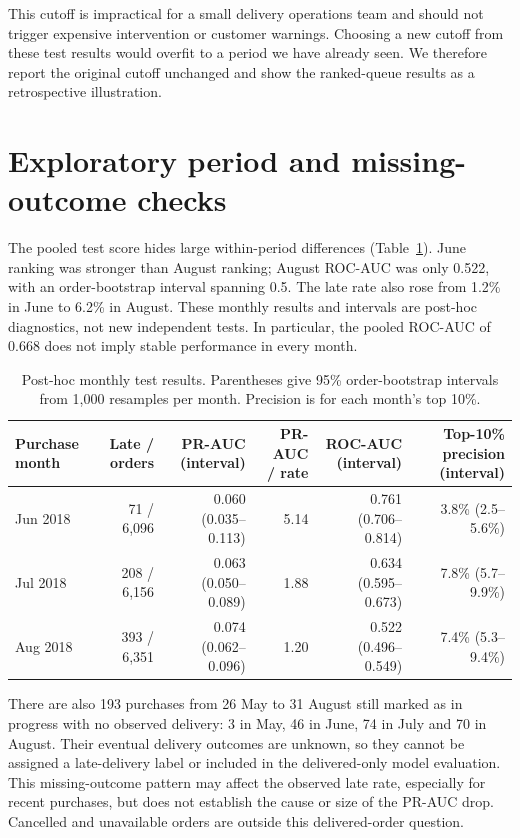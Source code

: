 \documentclass[12pt,a4paper]{article}
\begin{document}
This cutoff is impractical for a small delivery operations team and should not trigger expensive intervention or customer warnings. Choosing a new cutoff from these test results would overfit to a period we have already seen. We therefore report the original cutoff unchanged and show the ranked-queue results as a retrospective illustration.

\section*{Exploratory period and missing-outcome checks}
The pooled test score hides large within-period differences (Table~\ref{tab:months}). June ranking was stronger than August ranking; August ROC-AUC was only 0.522, with an order-bootstrap interval spanning 0.5. The late rate also rose from 1.2\% in June to 6.2\% in August. These monthly results and intervals are post-hoc diagnostics, not new independent tests. In particular, the pooled ROC-AUC of 0.668 does not imply stable performance in every month.

\begin{table}[h]
\centering\scriptsize
\caption{Post-hoc monthly test results. Parentheses give 95\% order-bootstrap intervals from 1,000 resamples per month. Precision is for each month's top 10\%.}
\label{tab:months}
\begin{tabular}{@{}lrrrrr@{}}
\toprule
Purchase month & Late / orders & PR-AUC (interval) & PR-AUC / rate & ROC-AUC (interval) & Top-10\% precision (interval) \\
\midrule
Jun 2018 & 71 / 6,096 & 0.060 (0.035--0.113) & 5.14 & 0.761 (0.706--0.814) & 3.8\% (2.5--5.6\%) \\
Jul 2018 & 208 / 6,156 & 0.063 (0.050--0.089) & 1.88 & 0.634 (0.595--0.673) & 7.8\% (5.7--9.9\%) \\
Aug 2018 & 393 / 6,351 & 0.074 (0.062--0.096) & 1.20 & 0.522 (0.496--0.549) & 7.4\% (5.3--9.4\%) \\
\bottomrule
\end{tabular}
\end{table}

There are also 193 purchases from 26 May to 31 August still marked as in progress with no observed delivery: 3 in May, 46 in June, 74 in July and 70 in August. Their eventual delivery outcomes are unknown, so they cannot be assigned a late-delivery label or included in the delivered-only model evaluation. This missing-outcome pattern may affect the observed late rate, especially for recent purchases, but does not establish the cause or size of the PR-AUC drop. Cancelled and unavailable orders are outside this delivered-order question.
\end{document}
